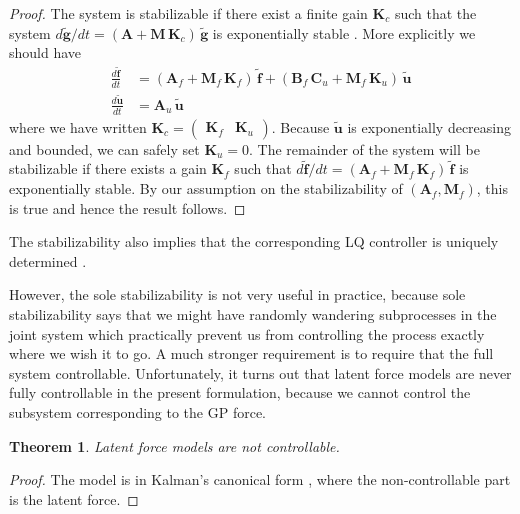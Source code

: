 \documentclass[journal]{IEEEtran}
\newtheorem{theorem}{Theorem}[section]
\newcommand{\simo}[1]{{\color{red}#1}}
\begin{document}
\begin{proof}
The system is stabilizable if there exist a finite gain $\mathbf{K}_c$ such that the system $d\tilde{\mathbf{g}}/dt = (\mathbf{A} + \mathbf{M} \, \mathbf{K}_c) \, \tilde{\mathbf{g}}$ is exponentially stable \cite{Wonham:1985}. More explicitly we should have
%
\begin{equation}
\begin{split}
  \frac{d\tilde{\mathbf{f}}}{dt} &= (\mathbf{A}_f + \mathbf{M}_f \, \mathbf{K}_f) \, \tilde{\mathbf{f}}
  + (\mathbf{B}_f \, \mathbf{C}_u + \mathbf{M}_f \, \mathbf{K}_u) \, \tilde{\mathbf{u}} \\
  \frac{d\tilde{\mathbf{u}}}{dt} &= \mathbf{A}_u \, \tilde{\mathbf{u}}
\end{split}
\end{equation}
%
where we have written $\mathbf{K}_c = \begin{pmatrix} \mathbf{K}_f & \mathbf{K}_u \end{pmatrix}$. Because $\tilde{\mathbf{u}}$ is exponentially decreasing and bounded, we can safely set $\mathbf{K}_u = 0$. The remainder of the system will be stabilizable if there exists a gain $\mathbf{K}_f$ such that $d\tilde{\mathbf{f}}/dt = (\mathbf{A}_f + \mathbf{M}_f \, \mathbf{K}_f) \, \tilde{\mathbf{f}}$ is exponentially stable. By our assumption on the stabilizability of $(\mathbf{A}_f,\mathbf{M}_f)$, this is true and hence the result follows.
\end{proof}

The stabilizability also implies that the corresponding LQ controller is uniquely determined \cite{Anderson+Moore:2007}.

However, the sole stabilizability is not very useful in practice, because sole stabilizability says that we might have randomly wandering subprocesses in the joint system which practically prevent us from controlling the process exactly where we wish it to go. A much stronger requirement is to require that the full system controllable. Unfortunately, it turns out that latent force models are never fully controllable in the present formulation, because we cannot control the subsystem corresponding to the GP force.

\begin{theorem}
  Latent force models are not controllable.
\end{theorem}

\begin{proof}
  The model is in Kalman's canonical form \cite{Kalman:1963}, where the non-controllable part is the latent force.
\end{proof}
\end{document}
